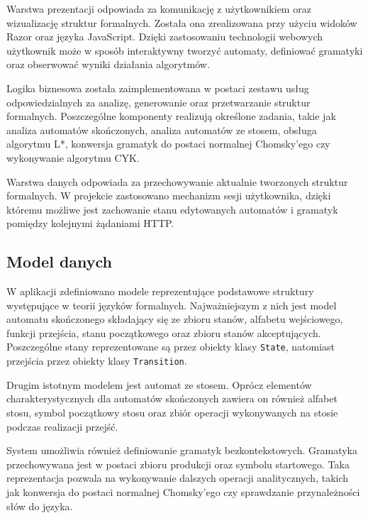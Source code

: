 \documentclass[12pt]{article}
\begin{document}
Warstwa prezentacji odpowiada za komunikację z użytkownikiem oraz wizualizację struktur formalnych. Została ona zrealizowana przy użyciu widoków Razor oraz języka JavaScript. Dzięki zastosowaniu technologii webowych użytkownik może w sposób interaktywny tworzyć automaty, definiować gramatyki oraz obserwować wyniki działania algorytmów.

Logika biznesowa została zaimplementowana w postaci zestawu usług odpowiedzialnych za analizę, generowanie oraz przetwarzanie struktur formalnych. Poszczególne komponenty realizują określone zadania, takie jak analiza automatów skończonych, analiza automatów ze stosem, obsługa algorytmu L*, konwersja gramatyk do postaci normalnej Chomsky'ego czy wykonywanie algorytmu CYK.

Warstwa danych odpowiada za przechowywanie aktualnie tworzonych struktur formalnych. W projekcie zastosowano mechanizm sesji użytkownika, dzięki któremu możliwe jest zachowanie stanu edytowanych automatów i gramatyk pomiędzy kolejnymi żądaniami HTTP.

\subsection{Model danych}

W aplikacji zdefiniowano modele reprezentujące podstawowe struktury występujące w teorii języków formalnych. Najważniejszym z nich jest model automatu skończonego składający się ze zbioru stanów, alfabetu wejściowego, funkcji przejścia, stanu początkowego oraz zbioru stanów akceptujących. Poszczególne stany reprezentowane są przez obiekty klasy \texttt{State}, natomiast przejścia przez obiekty klasy \texttt{Transition}.

Drugim istotnym modelem jest automat ze stosem. Oprócz elementów charakterystycznych dla automatów skończonych zawiera on również alfabet stosu, symbol początkowy stosu oraz zbiór operacji wykonywanych na stosie podczas realizacji przejść.

System umożliwia również definiowanie gramatyk bezkontekstowych. Gramatyka przechowywana jest w postaci zbioru produkcji oraz symbolu startowego. Taka reprezentacja pozwala na wykonywanie dalszych operacji analitycznych, takich jak konwersja do postaci normalnej Chomsky'ego czy sprawdzanie przynależności słów do języka.
\\
\end{document}
